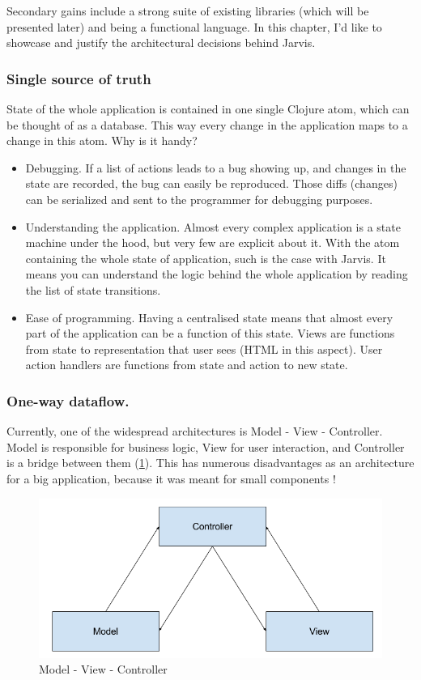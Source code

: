 \documentclass[11pt]{scrartcl}
\begin{document}
Secondary gains include a strong suite of existing libraries (which will be
presented later) and being a functional language.
In this chapter, I’d like to showcase and justify the architectural decisions
behind Jarvis.

\subsubsection{Single source of truth}
State of the whole application is contained in one single Clojure atom, which
can be thought of as a database.
This way every change in the application maps to a change in this atom.
Why is it handy?
\begin{itemize}
\item Debugging. If a list of actions leads to a bug showing up, and changes in
  the state are recorded, the bug can easily be reproduced. Those diffs
  (changes) can be serialized and sent to the programmer for debugging purposes.
\item Understanding the application. Almost every complex application is a state
  machine under the hood, but very few are explicit about it. With the atom
  containing the whole state of application, such is the case with Jarvis. It
  means you can understand the logic behind the whole application by reading the
  list of state transitions.
\item Ease of programming. Having a centralised state
  means that almost every part of the application can be a function of this
  state. Views are functions from state to representation that user sees (HTML
  in this aspect). User action handlers are functions from state and action to
  new state.
\end{itemize}
\subsubsection{One-way dataflow.}
Currently, one of the widespread architectures is Model - View - Controller.
Model is responsible for business logic, View for user interaction, and
Controller is a bridge between them (\ref{mvc}).
This has numerous disadvantages as an architecture for a big application,
because it was meant for small components \cite{Krasner:1988:CUM:50757.50759}!

\begin{figure}[hbt]
  \includegraphics[scale=0.3]{img/MVC}
  \caption{Model - View - Controller}
  \label{mvc}
\end{figure}
\end{document}
